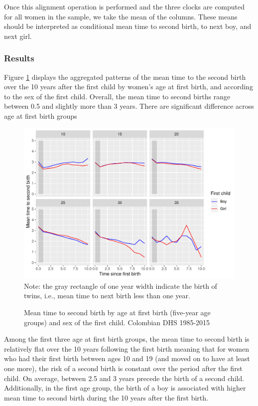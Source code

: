 \documentclass{article}
\begin{document}
Once this alignment operation is performed and the three clocks are computed for all women in the sample, we take the mean of the columns. These means should be interpreted as conditional mean time to second birth, to next boy, and next girl.

\subsubsection{Results}
Figure \ref{fert_01} displays the aggregated patterns of the mean time to the second birth over the 10 years after the first child by women's age at first birth, and according to the sex of the first child. Overall, the mean time to second births range between 0.5 and slightly more than 3 years. There are significant difference across age at first birth groups

\begin{figure}[H]
    \centering
    \caption{Mean time to second birth by age at first birth (five-year age groups) and sex of the first child. Colombian DHS 1985-2015}
    \includegraphics{Spells/Figures/mt_second_birth_by_sex_first.pdf}
    \label{fert_01}
    Note: the gray rectangle of one year width indicate the birth of twins, i.e., mean time to next birth less than one year.
\end{figure}

Among the first three age at first birth groups, the mean time to second birth is relatively flat over the 10 years following the first birth meaning that for women who had their first birth between ages 10 and 19 (and moved on to have at least one more), the risk of a second birth is constant over the period after the first child. On average, between 2.5 and 3 years precede the birth of a second child. Additionally, in the first age group, the birth of a boy is associated with higher mean time to second birth during the 10 years after the first birth.
\end{document}
